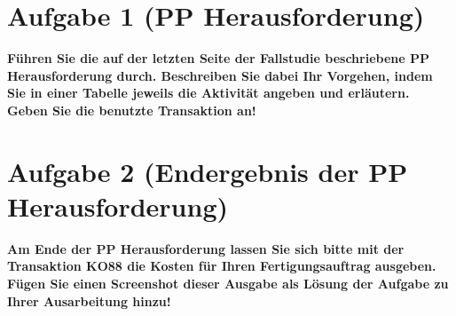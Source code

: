 \section{Aufgabe 1 (PP Herausforderung)}
\textbf{Führen Sie die auf der letzten Seite der Fallstudie beschriebene PP Herausforderung durch.
Beschreiben Sie dabei Ihr Vorgehen, indem Sie in einer Tabelle jeweils die Aktivität angeben
und erläutern. Geben Sie die benutzte Transaktion an!}

\clearpage
{}
\clearpage 

\section{Aufgabe 2 (Endergebnis der PP Herausforderung)}
\textbf{Am Ende der PP Herausforderung lassen Sie sich bitte mit der Transaktion KO88 die Kosten
für Ihren Fertigungsauftrag ausgeben. Fügen Sie einen Screenshot dieser Ausgabe
als Lösung der Aufgabe zu Ihrer Ausarbeitung hinzu!}

\clearpage 
